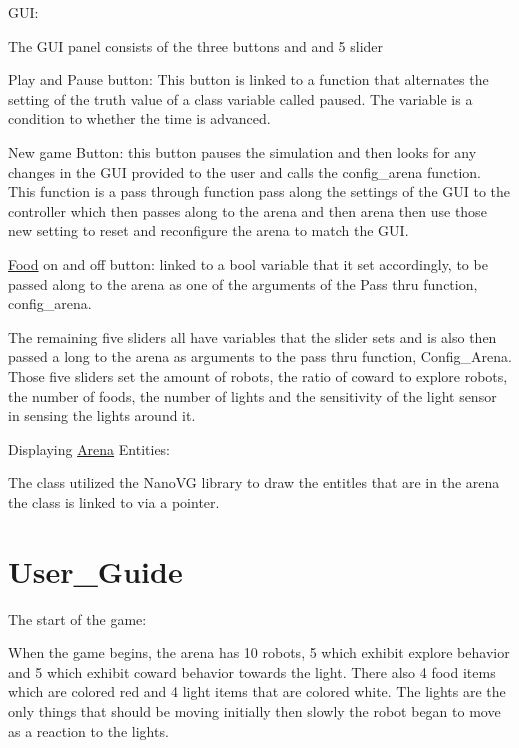 \begin{DoxyItemize}
\item G\+UI\+:
\begin{DoxyItemize}
\item The G\+UI panel consists of the three buttons and and 5 slider
\item Play and Pause button\+: This button is linked to a function that alternates the setting of the truth value of a class variable called paused. The variable is a condition to whether the time is advanced.
\item New game Button\+: this button pauses the simulation and then looks for any changes in the G\+UI provided to the user and calls the config\+\_\+arena function. This function is a pass through function pass along the settings of the G\+UI to the controller which then passes along to the arena and then arena then use those new setting to reset and reconfigure the arena to match the G\+UI.
\item \mbox{\hyperlink{class_food}{Food}} on and off button\+: linked to a bool variable that it set accordingly, to be passed along to the arena as one of the arguments of the Pass thru function, config\+\_\+arena.
\item The remaining five sliders all have variables that the slider sets and is also then passed a long to the arena as arguments to the pass thru function, Config\+\_\+\+Arena. Those five sliders set the amount of robots, the ratio of coward to explore robots, the number of foods, the number of lights and the sensitivity of the light sensor in sensing the lights around it.
\end{DoxyItemize}
\item Displaying \mbox{\hyperlink{class_arena}{Arena}} Entities\+:
\begin{DoxyItemize}
\item The class utilized the Nano\+VG library to draw the entitles that are in the arena the class is linked to via a pointer.
\end{DoxyItemize}
\end{DoxyItemize}\hypertarget{index_User_Guide}{}\section{User\+\_\+\+Guide}\label{index_User_Guide}
The start of the game\+:

When the game begins, the arena has 10 robots, 5 which exhibit explore behavior and 5 which exhibit coward behavior towards the light. There also 4 food items which are colored red and 4 light items that are colored white. The lights are the only things that should be moving initially then slowly the robot began to move as a reaction to the lights.

